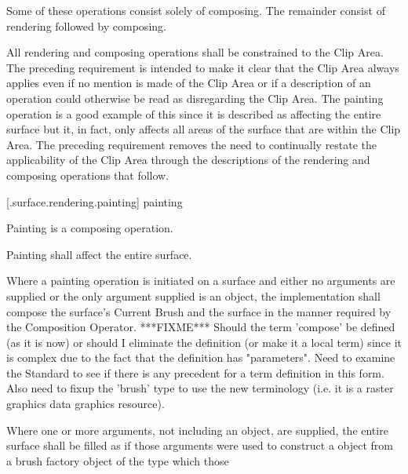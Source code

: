 \pnum
Some of these operations consist solely of composing. The remainder consist of rendering followed by composing.


\pnum
All rendering and composing operations shall be constrained to the Clip Area.
\enternote
The preceding requirement is intended to make it clear that the Clip Area always applies even if no mention is made of the Clip Area or if a description of an operation could otherwise be read as disregarding the Clip Area. The painting operation is a good example of this since it is described as affecting the entire surface but it, in fact, only affects all areas of the surface that are within the Clip Area. The preceding requirement removes the need to continually restate the applicability of the Clip Area through the descriptions of the rendering and composing operations that follow.
\exitnote

 [\iotwod.surface.rendering.painting] { painting}

\pnum
Painting is a composing operation.

\pnum
Painting shall affect the entire surface.

\pnum
Where a painting operation is initiated on a surface and either no arguments are supplied or the only argument supplied is an  object, the implementation shall compose the surface's Current Brush and the surface in the manner required by the Composition Operator.
\enternote
***FIXME*** Should the term 'compose' be defined (as it is now) or should I eliminate the definition (or make it a local term) since it is complex due to the fact that the definition has "parameters". Need to examine the Standard to see if there is any precedent for a term definition in this form. Also need to fixup the 'brush' type to use the new terminology (i.e. it is a raster graphics data graphics resource).
\exitnote

\pnum
Where one or more arguments, not including an  object, are supplied, the entire surface shall be filled as if those arguments were used to construct a  object from a brush factory object of the type which those 

